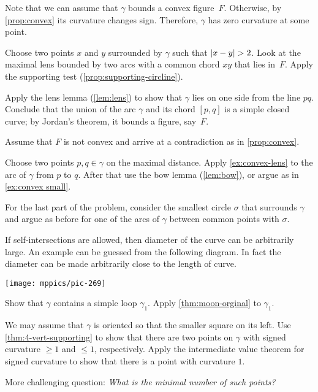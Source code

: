 \begin{multicols}{2}
Note that we can assume that $\gamma$ bounds a convex figure~$F$.
Otherwise, by \ref{prop:convex} its curvature changes sign.
Therefore, $\gamma$ has zero curvature at some point.

Choose two points $x$ and $y$ surrounded by $\gamma$ such that $|x\z-y|\z>2$.
Look at the maximal lens bounded by two arcs with a common chord $xy$ that lies in~$F$.
Apply the supporting test (\ref{prop:supporting-circline}).

Apply the lens lemma (\ref{lem:lens}) to show that $\gamma$ lies on one side from the line $pq$.
Conclude that the union of the arc $\gamma$ and its chord $[p,q]$ is a simple closed curve;
by Jordan's theorem, it bounds a figure, say~$F$.

Assume that $F$ is not convex and arrive at a contradiction as in \ref{prop:convex}. 

Choose two points $p,q\in\gamma$ on the maximal distance.
Apply \ref{ex:convex-lens} to the arc of $\gamma$ from $p$ to $q$.
After that use the bow lemma (\ref{lem:bow}), or argue as in \ref{ex:convex small}.

For the last part of the problem, consider the smallest circle $\sigma$ that surrounds $\gamma$ and argue as before for one of the arcs of $\gamma$ between common points with $\sigma$.

If self-intersections are allowed, then diameter of the curve can be arbitrarily large.
An example can be guessed from the following diagram.
In fact the diameter can be made arbitrarily close to the length of curve.
\begin{Figure}
\vskip-0mm
\centering
\texttt{[image: mppics/pic-269]}
\vskip-0mm
\end{Figure}

Show that $\gamma$ contains a simple loop $\gamma_1$.
Apply \ref{thm:moon-orginal} to $\gamma_1$.

We may assume that $\gamma$ is oriented so that the smaller square on its left.
Use \ref{thm:4-vert-supporting} to show that there are two points on $\gamma$ with signed curvature $\ge 1$ and $\le 1$, respectively.
Apply the intermediate value theorem for signed curvature to show that there is a point with curvature $1$.

\medskip

More challenging question: \textit{What is the minimal number of such points?}


\end{multicols}
